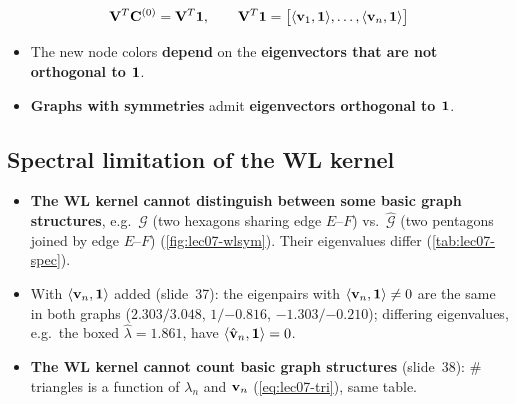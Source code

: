 \begin{equation}\label{eq:lec07-uniform}
  \mathbf{V}^T\mathbf{C}^{(0)} = \mathbf{V}^T\mathbf{1},\qquad
  \mathbf{V}^T\mathbf{1} = \big[\langle\mathbf{v}_1,\mathbf{1}\rangle,\dots,\langle\mathbf{v}_n,\mathbf{1}\rangle\big]
\end{equation}
\begin{itemize}
  \item The new node colors \textbf{depend} on the \textbf{eigenvectors that are
    not orthogonal to $\mathbf{1}$}.
  \item \textbf{Graphs with symmetries} admit \textbf{eigenvectors orthogonal to
    $\mathbf{1}$}.
\end{itemize}

\subsection{Spectral limitation of the WL kernel}\label{sec:lec07-wllimit}

\begin{itemize}
  \item \textbf{The WL kernel cannot distinguish between some basic graph
    structures}, e.g.\ $\mathcal{G}$ (two hexagons sharing edge $E$--$F$) vs.\
    $\hat{\mathcal{G}}$ (two pentagons joined by edge $E$--$F$)
    (\cref{fig:lec07-wlsym}). Their eigenvalues differ (\cref{tab:lec07-spec}).
  \item With $\langle\mathbf{v}_n,\mathbf{1}\rangle$ added (slide~37): the eigenpairs with
    $\langle\mathbf{v}_n,\mathbf{1}\rangle\neq0$ are the same in both graphs
    ($2.303/3.048$, $1/{-0.816}$, $-1.303/{-0.210}$); differing eigenvalues, e.g.\
    the boxed $\hat\lambda=1.861$, have $\langle\hat{\mathbf{v}}_n,\mathbf{1}\rangle=0$.
  \item \textbf{The WL kernel cannot count basic graph structures} (slide~38):
    $\#$triangles is a function of $\lambda_n$ and $\mathbf{v}_n$ (\cref{eq:lec07-tri}),
    same table.
\end{itemize}

